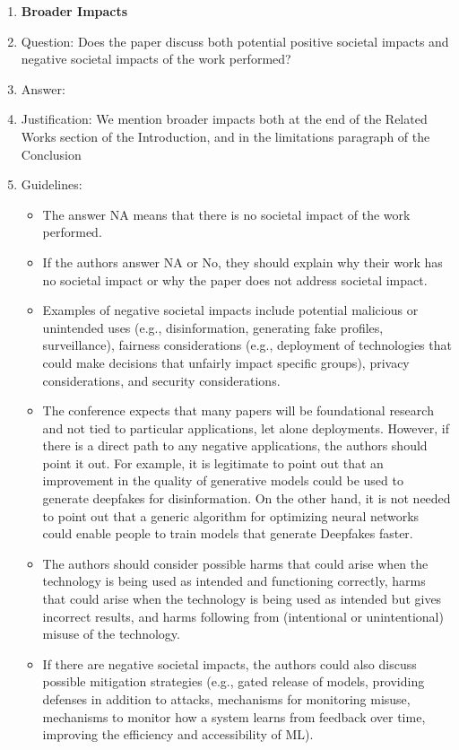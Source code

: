 \documentclass{article}
\begin{document}
\begin{enumerate}
\item {\bf Broader Impacts}
    \item[] Question: Does the paper discuss both potential positive societal impacts and negative societal impacts of the work performed?
    \item[] Answer: \answerYes{} %
    \item[] Justification:
    We mention broader impacts both at the end of the Related Works section of the Introduction, and in the limitations paragraph of the Conclusion
    
    \item[] Guidelines:
    \begin{itemize}
        \item The answer NA means that there is no societal impact of the work performed.
        \item If the authors answer NA or No, they should explain why their work has no societal impact or why the paper does not address societal impact.
        \item Examples of negative societal impacts include potential malicious or unintended uses (e.g., disinformation, generating fake profiles, surveillance), fairness considerations (e.g., deployment of technologies that could make decisions that unfairly impact specific groups), privacy considerations, and security considerations.
        \item The conference expects that many papers will be foundational research and not tied to particular applications, let alone deployments. However, if there is a direct path to any negative applications, the authors should point it out. For example, it is legitimate to point out that an improvement in the quality of generative models could be used to generate deepfakes for disinformation. On the other hand, it is not needed to point out that a generic algorithm for optimizing neural networks could enable people to train models that generate Deepfakes faster.
        \item The authors should consider possible harms that could arise when the technology is being used as intended and functioning correctly, harms that could arise when the technology is being used as intended but gives incorrect results, and harms following from (intentional or unintentional) misuse of the technology.
        \item If there are negative societal impacts, the authors could also discuss possible mitigation strategies (e.g., gated release of models, providing defenses in addition to attacks, mechanisms for monitoring misuse, mechanisms to monitor how a system learns from feedback over time, improving the efficiency and accessibility of ML).
    \end{itemize}


\end{enumerate}
\end{document}
